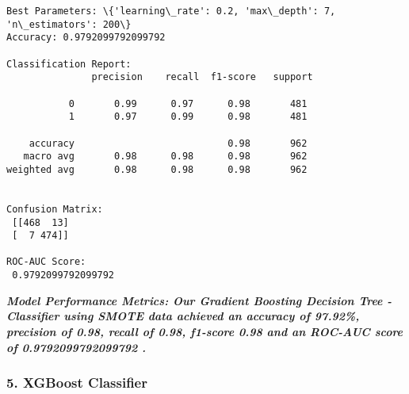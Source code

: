 \documentclass[11pt]{article}
\begin{document}
    \begin{Verbatim}[commandchars=\\\{\}]
Best Parameters: \{'learning\_rate': 0.2, 'max\_depth': 7, 'n\_estimators': 200\}
Accuracy: 0.9792099792099792

Classification Report:
               precision    recall  f1-score   support

           0       0.99      0.97      0.98       481
           1       0.97      0.99      0.98       481

    accuracy                           0.98       962
   macro avg       0.98      0.98      0.98       962
weighted avg       0.98      0.98      0.98       962


Confusion Matrix:
 [[468  13]
 [  7 474]]

ROC-AUC Score:
 0.9792099792099792
    \end{Verbatim}

    \textbf{\emph{Model Performance Metrics: Our Gradient Boosting Decision
Tree - Classifier using SMOTE data achieved an accuracy of 97.92\%,
precision of 0.98, recall of 0.98, f1-score 0.98 and an ROC-AUC score of
0.9792099792099792 .}}

    \subsubsection{5. XGBoost Classifier}\label{xgboost-classifier}
\end{document}
